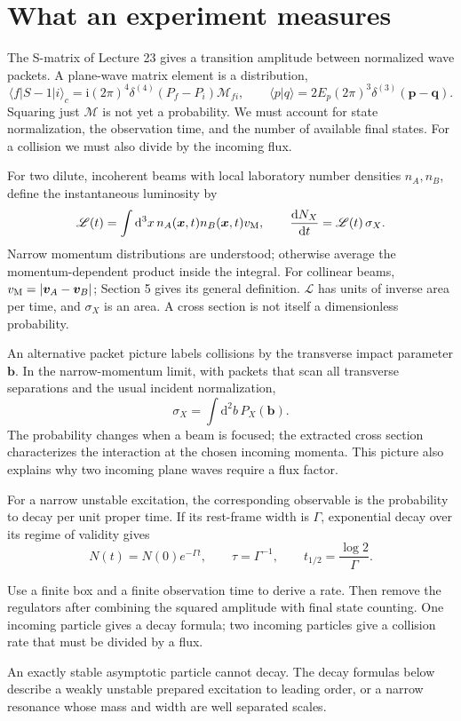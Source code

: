 \documentclass[11pt]{article}
\newcommand{\dd}{\mathrm d}
\newcommand{\ii}{\mathrm i}
\newcommand{\cM}{\mathcal M}
\begin{document}
\section{What an experiment measures}
The S-matrix of Lecture 23 gives a transition amplitude between normalized
wave packets. A plane-wave matrix element is a distribution,
\begin{equation}
 \langle f|S-1|i\rangle_c
 =\ii(2\pi)^4\delta^{(4)}(P_f-P_i)\cM_{fi},
 \qquad
 \langle p|q\rangle=2E_p(2\pi)^3\delta^{(3)}(\bm p-\bm q).
 \label{eq:amp}
\end{equation}
Squaring just \(\cM\) is not yet a probability. We must account for state
normalization, the observation time, and the number of available final
states. For a collision we must also divide by the incoming flux.

For two dilute, incoherent beams with local laboratory number densities
\(n_A,n_B\), define the instantaneous luminosity by
\begin{equation}
 \mathscr L(t)=\int\dd^3x\,n_A(\bm x,t)n_B(\bm x,t)v_{\rm M},
 \qquad \frac{\dd N_X}{\dd t}=\mathscr L(t)\,\sigma_X .
 \label{eq:luminosity}
\end{equation}
Narrow momentum distributions are understood; otherwise average the
momentum-dependent product inside the integral. For collinear beams,
\(v_{\rm M}=|\bm v_A-\bm v_B|\); Section 5 gives its general definition.
\(\mathscr L\) has units of inverse area per time, and \(\sigma_X\) is an
area. A cross section is not itself a dimensionless probability.

An alternative packet picture labels collisions by the transverse impact
parameter \(\bm b\). In the narrow-momentum limit, with packets that scan
all transverse separations and the usual incident normalization,
\begin{equation}
 \sigma_X=\int\dd^2b\,P_X(\bm b).
\end{equation}
The probability changes when a beam is focused; the extracted cross section
characterizes the interaction at the chosen incoming momenta. This
picture also explains why two incoming plane waves require a flux factor.

For a narrow unstable excitation, the corresponding observable is the
probability to decay per unit proper time. If its rest-frame width is
\(\Gamma\), exponential decay over its regime of validity gives
\begin{equation}
 N(t)=N(0)e^{-\Gamma t},\qquad
 \tau=\Gamma^{-1},\qquad t_{1/2}=\frac{\log2}{\Gamma}.
\end{equation}
\begin{keyidea}
Use a finite box and a finite observation time to derive a rate. Then
remove the regulators after combining the squared amplitude with final
state counting. One incoming particle gives a decay formula; two incoming
particles give a collision rate that must be divided by a flux.
\end{keyidea}
An exactly stable asymptotic particle cannot decay. The decay formulas
below describe a weakly unstable prepared excitation to leading order,
or a narrow resonance whose mass and width are well separated scales.
\end{document}
